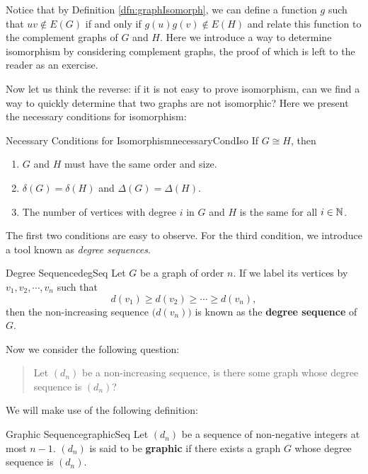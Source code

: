 \documentclass[math]{amznotes}
\makeatletter
\let\save@mathaccent\mathaccent
\newcommand*\if@single[3]{%
  \setbox0\hbox{${\mathaccent"0362{#1}}^H$}%
  \setbox2\hbox{${\mathaccent"0362{\kern0pt#1}}^H$}%
  \ifdim\ht0=\ht2 #3\else #2\fi
  }
\newcommand*\rel@kern[1]{\kern#1\dimexpr\macc@kerna}
\newcommand*\widebar[1]{\@ifnextchar^{{\wide@bar{#1}{0}}}{\wide@bar{#1}{1}}}
\newcommand*\wide@bar[2]{\if@single{#1}{\wide@bar@{#1}{#2}{1}}{\wide@bar@{#1}{#2}{2}}}
\newcommand*\wide@bar@[3]{%
  \begingroup
  \def\mathaccent##1##2{%
    \let\mathaccent\save@mathaccent
    \if#32 \let\macc@nucleus\first@char \fi
    \setbox\z@\hbox{$\macc@style{\macc@nucleus}_{}$}%
    \setbox\tw@\hbox{$\macc@style{\macc@nucleus}{}_{}$}%
    \dimen@\wd\tw@
    \advance\dimen@-\wd\z@
    \divide\dimen@ 3
    \@tempdima\wd\tw@
    \advance\@tempdima-\scriptspace
    \divide\@tempdima 10
    \advance\dimen@-\@tempdima
    \ifdim\dimen@>\z@ \dimen@0pt\fi
    \rel@kern{0.6}\kern-\dimen@
    \if#31
      \overline{\rel@kern{-0.6}\kern\dimen@\macc@nucleus\rel@kern{0.4}\kern\dimen@}%
      \advance\dimen@0.4\dimexpr\macc@kerna
      \let\final@kern#2%
      \ifdim\dimen@<\z@ \let\final@kern1\fi
      \if\final@kern1 \kern-\dimen@\fi
    \else
      \overline{\rel@kern{-0.6}\kern\dimen@#1}%
    \fi
  }%
  \macc@depth\@ne
  \let\math@bgroup\@empty \let\math@egroup\macc@set@skewchar
  \mathsurround\z@ \frozen@everymath{\mathgroup\macc@group\relax}%
  \macc@set@skewchar\relax
  \let\mathaccentV\macc@nested@a
  \if#31
    \macc@nested@a\relax111{#1}%
  \else
    \def\gobble@till@marker##1\endmarker{}%
    \futurelet\first@char\gobble@till@marker#1\endmarker
    \ifcat\noexpand\first@char A\else
      \def\first@char{}%
    \fi
    \macc@nested@a\relax111{\first@char}%
  \fi
  \endgroup
}
\theoremstyle{remark}
\makeatother
\begin{document}
Notice that by Definition \ref{dfn:graphIsomorph}, we can define a function $g$ such that $uv \notin E(G)$ if and only if $g(u)g(v) \notin E(H)$ and relate this function to the complement graphs of $G$ and $H$. Here we introduce a way to determine isomorphism by considering complement graphs, the proof of which is left to the reader as an exercise.
Now let us think the reverse: if it is not easy to prove isomorphism, can we find a way to quickly determine that two graphs are not isomorphic? Here we present the necessary conditions for isomorphism:
\begin{thmbox}{Necessary Conditions for Isomorphism}{necessaryCondIso}
    If $G \cong H$, then
    \begin{enumerate}
        \item $G$ and $H$ must have the same order and size.
        \item $\delta(G) = \delta(H)$ and $\Delta(G) = \Delta(H)$.
        \item The number of vertices with degree $i$ in $G$ and $H$ is the same for all $i \in \mathbb{N}$.
    \end{enumerate}
\end{thmbox}
The first two conditions are easy to observe. For the third condition, we introduce a tool known as \textit{degree sequences}.
\begin{dfnbox}{Degree Sequence}{degSeq}
    Let $G$ be a graph of order $n$. If we label its vertices by $v_1, v_2, \cdots, v_n$ such that
    \begin{equation*}
        d(v_1) \geq d(v_2) \geq \cdots \geq d(v_n),
    \end{equation*}
    then the non-increasing sequence $\bigl(d(v_n)\bigr)$ is known as the {\color{red} \textbf{degree sequence}} of $G$.
\end{dfnbox}
Now we consider the following question:
\begin{quote}
    Let $(d_n)$ be a non-increasing sequence, is there some graph whose degree sequence is $(d_n)$?
\end{quote}
We will make use of the following definition:
\begin{dfnbox}{Graphic Sequence}{graphicSeq}
    Let $(d_n)$ be a sequence of non-negative integers at most $n - 1$. $(d_n)$ is said to be {\color{red} \textbf{graphic}} if there exists a graph $G$ whose degree sequence is $(d_n)$.
\end{dfnbox}
\end{document}
